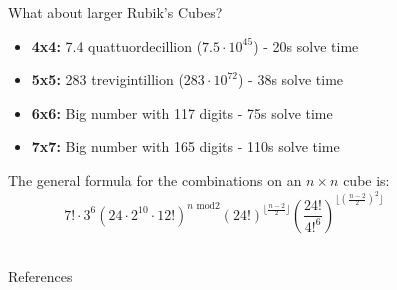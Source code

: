 \documentclass[final]{beamer}
\newlength{\sepwidth}
\newlength{\colwidth}
\newcommand{\separatorcolumn}{\begin{column}{\sepwidth}\end{column}}
\begin{document}
\begin{frame}[t]
\begin{columns}[t]
\begin{column}{\colwidth}
\begin{block}{What about larger Rubik's Cubes?}
    \begin{itemize}
      \item \textbf{4x4:} 7.4 quattuordecillion ($7.5\cdot 10^{45}$) - 20s solve time
      \item \textbf{5x5:} 283 trevigintillion ($283 \cdot 10^{72}$) - 38s solve time
      \item \textbf{6x6:} Big number with 117 digits - 75s solve time
      \item \textbf{7x7:} Big number with 165 digits - 110s solve time
    \end{itemize}

    The general formula for the combinations on an $n \times n$ cube is: \\

    $$ \displaystyle 7! \cdot  3^6 \left( 24 \cdot 2^{10} \cdot 12!  \right)^{n \text{ mod} 2}
    (24!)^{\lfloor \frac{n-2}{2} \rfloor} \left( \displaystyle\frac{24!}{4!^{6}} 
    \right)^{\lfloor \left( \frac{n-2}{2} \right)^2 \rfloor} $$ \\


  \end{block}

  \begin{block}{References}

    \nocite{*}
    \footnotesize{}

  \end{block}

\end{column}

\separatorcolumn
\end{columns}
\end{frame}
\end{document}
